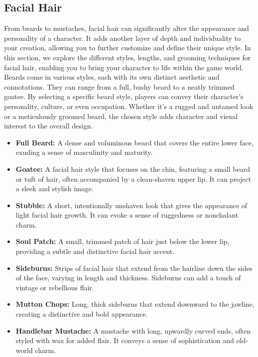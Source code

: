 \documentclass[12pt]{book}  %
\begin{document}
\subsection{\textbf{Facial Hair}}

From beards to mustaches, facial hair can significantly alter the appearance and personality of a character. It adds another layer of depth and individuality to your creation, allowing you to further customize and define their unique style. In this section, we explore the different styles, lengths, and grooming techniques for facial hair, enabling you to bring your character to life within the game world. Beards come in various styles, each with its own distinct aesthetic and connotations. They can range from a full, bushy beard to a neatly trimmed goatee. By selecting a specific beard style, players can convey their character's personality, culture, or even occupation. Whether it's a rugged and untamed look or a meticulously groomed beard, the chosen style adds character and visual interest to the overall design.

\begin{itemize}
    \item \textbf{Full Beard:} A dense and voluminous beard that covers the entire lower face, exuding a sense of masculinity and maturity.
    \item \textbf{Goatee:} A facial hair style that focuses on the chin, featuring a small beard or tuft of hair, often accompanied by a clean-shaven upper lip. It can project a sleek and stylish image.
    \item \textbf{Stubble:} A short, intentionally unshaven look that gives the appearance of light facial hair growth. It can evoke a sense of ruggedness or nonchalant charm.
    \item \textbf{Soul Patch:} A small, trimmed patch of hair just below the lower lip, providing a subtle and distinctive facial hair accent.
    \item \textbf{Sideburns:} Strips of facial hair that extend from the hairline down the sides of the face, varying in length and thickness. Sideburns can add a touch of vintage or rebellious flair.
    \item \textbf{Mutton Chops:} Long, thick sideburns that extend downward to the jawline, creating a distinctive and bold appearance.
    \item \textbf{Handlebar Mustache:} A mustache with long, upwardly curved ends, often styled with wax for added flair. It conveys a sense of sophistication and old-world charm.
\end{itemize}
\end{document}
